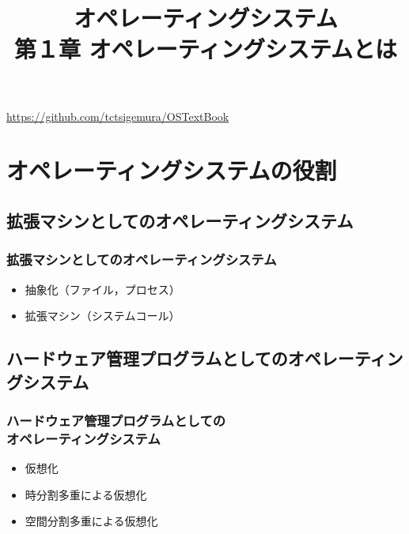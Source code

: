 \documentclass[unicode]{beamer}                   %
\begin{document}
\title[オペレーティングシステムとは]
      {オペレーティングシステム\\第１章 オペレーティングシステムとは}
\date{}
\begin{frame}
  \titlepage
  \centerline{\url{https://github.com/tctsigemura/OSTextBook}}
\end{frame}


\section{オペレーティングシステムの役割}
\subsection{拡張マシンとしてのオペレーティングシステム}
\begin{frame}
  \frametitle{拡張マシンとしてのオペレーティングシステム}
  \begin{itemize}
    \item 抽象化（ファイル，プロセス）
    \item 拡張マシン（システムコール）
  \end{itemize}
\end{frame}

\subsection{ハードウェア管理プログラムとしてのオペレーティングシステム}
\begin{frame}
  \frametitle{ハードウェア管理プログラムとしての\\オペレーティングシステム}
  \begin{itemize}
    \item 仮想化
    \item 時分割多重による仮想化
    \item 空間分割多重による仮想化
  \end{itemize}
\end{frame}

\end{document}

